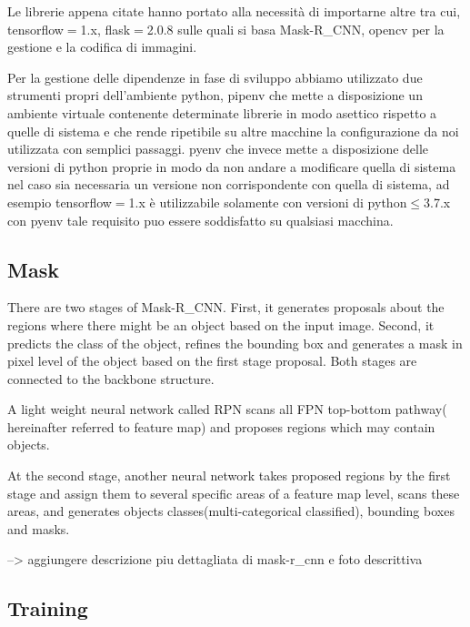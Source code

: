 \documentclass[12pt,a4paper]{article}
\newcommand{\mrcnn}{Mask-R\_CNN}
\begin{document}
Le librerie appena citate hanno portato alla necessità di importarne
altre tra cui, tensorflow$=$1.x, flask$=$2.0.8 sulle quali si basa
\mrcnn, opencv per la gestione e la codifica di immagini.

Per la gestione delle dipendenze in fase di sviluppo abbiamo utilizzato
due strumenti propri dell'ambiente python, pipenv che mette a
disposizione un ambiente virtuale contenente determinate librerie in
modo asettico rispetto a quelle di sistema e che rende ripetibile su
altre macchine la configurazione da noi utilizzata con semplici
passaggi. pyenv che invece mette a disposizione delle versioni di python
proprie in modo da non andare a modificare quella di sistema nel caso
sia necessaria un versione non corrispondente con quella di sistema, ad
esempio tensorflow$=$1.x è utilizzabile solamente con versioni di
python$\leq$3.7.x con pyenv tale requisito puo essere soddisfatto su
qualsiasi macchina.

\subsection{Mask}

There are two stages of \mrcnn. First, it generates proposals about
the regions where there might be an object based on the input image.
Second, it predicts the class of the object, refines the bounding box
and generates a mask in pixel level of the object based on the first
stage proposal. Both stages are connected to the backbone structure.

A light weight neural network called RPN scans all FPN top-bottom
pathway( hereinafter referred to feature map) and proposes regions which
may contain objects.

At the second stage, another neural network takes proposed regions by
the first stage and assign them to several specific areas of a feature
map level, scans these areas, and generates objects
classes(multi-categorical classified), bounding boxes and masks.

--> aggiungere descrizione piu dettagliata di mask-r\_cnn e foto descrittiva

\subsection{Training}
\end{document}
